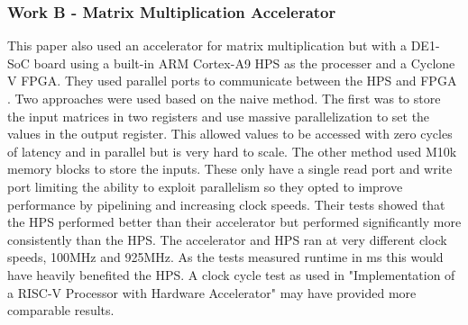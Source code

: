 \subsubsection{Work B - Matrix Multiplication Accelerator \citep{matrix_mult_accel}}
This paper also used an accelerator for matrix multiplication but with a DE1-SoC board using a built-in ARM Cortex-A9 HPS as the processer and a Cyclone V FPGA. They used parallel ports to communicate between the HPS and FPGA \cite{pio}. Two approaches were used based on the naive method. The first was to store the input matrices in two registers and use massive parallelization to set the values in the output register. This allowed values to be accessed with zero cycles of latency and in parallel but is very hard to scale. The other method used M10k memory blocks to store the inputs. These only have a single read port and write port limiting the ability to exploit parallelism so they opted to improve performance by pipelining and increasing clock speeds. Their tests showed that the HPS performed better than their accelerator but performed significantly more consistently than the HPS. The accelerator and HPS ran at very different clock speeds, 100MHz and 925MHz. As the tests measured runtime in ms this would have heavily benefited the HPS. A clock cycle test as used in "Implementation of a RISC-V Processor with Hardware Accelerator" may have provided more comparable results.

